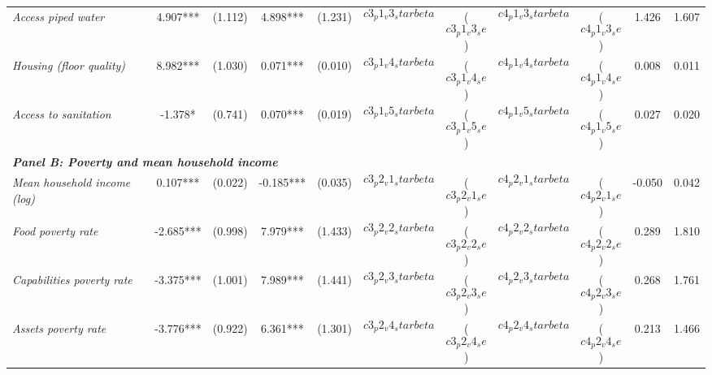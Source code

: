 \begin{tabular}{lcccccccccc}
\textit{Access piped water}  &  4.907***  
					   & (1.112) 
					   &  4.898***  
					   & (1.231)
					   &  $$c3_p1_v3_starbeta$$  
					   & ($$c3_p1_v3_se$$) 
					   &  $$c4_p1_v3_starbeta$$  
					   & ($$c4_p1_v3_se$$)					   
					   &  1.426  
					   &  1.607 \\[0.2cm]
					   
\textit{Housing (floor quality)}  &  8.982***  
					   & (1.030) 
					   &  0.071***  
					   & (0.010)
					   &  $$c3_p1_v4_starbeta$$  
					   & ($$c3_p1_v4_se$$) 
					   &  $$c4_p1_v4_starbeta$$  
					   & ($$c4_p1_v4_se$$)					   					   
					   &  0.008  
					   &  0.011 \\[0.2cm]
					   
\textit{Access to sanitation}  &  -1.378*  
					   & (0.741) 
					   &  0.070***  
					   & (0.019) 
					   &  $$c3_p1_v5_starbeta$$  
					   & ($$c3_p1_v5_se$$) 
					   &  $$c4_p1_v5_starbeta$$  
					   & ($$c4_p1_v5_se$$)					   
					   &  0.027  
					   &  0.020 \\[0.2cm]

\midrule

\multicolumn{9}{l}{\textit{\bf Panel  B: Poverty and mean household income}}   \\[0.2cm]  

\textit{Mean household income (log)}  &  0.107***  
					   & (0.022) 
					   &  -0.185***  
					   & (0.035)
					   &  $$c3_p2_v1_starbeta$$  
					   & ($$c3_p2_v1_se$$) 
					   &  $$c4_p2_v1_starbeta$$  
					   & ($$c4_p2_v1_se$$)					   
					   &  -0.050  
					   &  0.042 \\[0.2cm]
					   
\textit{Food poverty rate}  &  -2.685***  
					   & (0.998) 
					   &  7.979***  
					   & (1.433)
					   &  $$c3_p2_v2_starbeta$$  
					   & ($$c3_p2_v2_se$$) 
					   &  $$c4_p2_v2_starbeta$$  
					   & ($$c4_p2_v2_se$$)					   
					   &  0.289  
					   &  1.810 \\[0.2cm]
					   
\textit{Capabilities poverty rate}  &  -3.375***  
					   & (1.001) 
					   &  7.989***  
					   & (1.441)
					   &  $$c3_p2_v3_starbeta$$  
					   & ($$c3_p2_v3_se$$) 
					   &  $$c4_p2_v3_starbeta$$  
					   & ($$c4_p2_v3_se$$)					   
					   &  0.268  
					   &  1.761 \\[0.2cm]
					   
\textit{Assets poverty rate}  &  -3.776***  
					   & (0.922) 
					   &  6.361***  
					   & (1.301)
					   &  $$c3_p2_v4_starbeta$$  
					   & ($$c3_p2_v4_se$$) 
					   &  $$c4_p2_v4_starbeta$$  
					   & ($$c4_p2_v4_se$$)					   
					   &  0.213  
					   &  1.466 \\[0.2cm]


\end{tabular}
